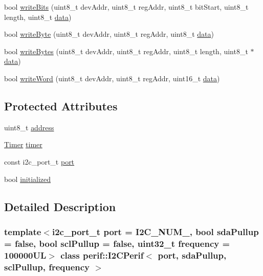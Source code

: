 \begin{DoxyCompactItemize}
\item 
bool \mbox{\hyperlink{classI2Cdev_a913371251b6a41520c080115650e1b59}{write\+Bits}} (uint8\+\_\+t dev\+Addr, uint8\+\_\+t reg\+Addr, uint8\+\_\+t bit\+Start, uint8\+\_\+t length, uint8\+\_\+t \mbox{\hyperlink{classperif_1_1PerifBase_a1a3afaa535fda17e9f97123fffe78765}{data}})
\item 
bool \mbox{\hyperlink{classI2Cdev_aeb297637ef985cd562da465ba61b7042}{write\+Byte}} (uint8\+\_\+t dev\+Addr, uint8\+\_\+t reg\+Addr, uint8\+\_\+t \mbox{\hyperlink{classperif_1_1PerifBase_a1a3afaa535fda17e9f97123fffe78765}{data}})
\item 
bool \mbox{\hyperlink{classI2Cdev_aa4e39cac6c0eac5112f9132084bcc93e}{write\+Bytes}} (uint8\+\_\+t dev\+Addr, uint8\+\_\+t reg\+Addr, uint8\+\_\+t length, uint8\+\_\+t $\ast$\mbox{\hyperlink{classperif_1_1PerifBase_a1a3afaa535fda17e9f97123fffe78765}{data}})
\item 
bool \mbox{\hyperlink{classI2Cdev_acbe68a802d6a177301736e60bedd1def}{write\+Word}} (uint8\+\_\+t dev\+Addr, uint8\+\_\+t reg\+Addr, uint16\+\_\+t \mbox{\hyperlink{classperif_1_1PerifBase_a1a3afaa535fda17e9f97123fffe78765}{data}})
\end{DoxyCompactItemize}
\subsection*{Protected Attributes}
\begin{DoxyCompactItemize}
\item 
uint8\+\_\+t \mbox{\hyperlink{classperif_1_1I2CPerif_a3275bcc89b3d8ddfa221fb76669c2d45}{address}}
\item 
\mbox{\hyperlink{classTimer}{Timer}} \mbox{\hyperlink{classperif_1_1Perif_acfa1256201bead82ccce1a0a8bcc24e1}{timer}}
\item 
const i2c\+\_\+port\+\_\+t \mbox{\hyperlink{classI2Cdev_a1d1e63732aa9f50369172b27a034129c}{port}}
\item 
bool \mbox{\hyperlink{classI2Cdev_a94b914bfcbd0fe1f6fdd7b9c6f4ab921}{initialized}}
\end{DoxyCompactItemize}


\subsection{Detailed Description}
\subsubsection*{template$<$i2c\+\_\+port\+\_\+t port = I2\+C\+\_\+\+N\+U\+M\+\_, bool sda\+Pullup = false, bool scl\+Pullup = false, uint32\+\_\+t frequency = 100000\+UL$>$\newline
class perif\+::\+I2\+C\+Perif$<$ port, sda\+Pullup, scl\+Pullup, frequency $>$}


